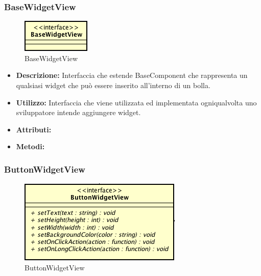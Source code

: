 \subsubsection{BaseWidgetView}

\label{BaseWidgetView}
\begin{figure}[ht]
	\centering
	\includegraphics[scale=0.5]{Sezioni/SottosezioniST/img/BaseWidgetView.png}
	\caption{BaseWidgetView}
\end{figure}

\begin{itemize}
\item \textbf{Descrizione:} Interfaccia che estende BaseComponent che rappresenta un qualsiasi widget che può essere inserito all'interno di un bolla.
\item \textbf{Utilizzo:} Interfaccia che viene utilizzata ed implementata ogniqualvolta uno sviluppatore intende aggiungere widget.
\item \textbf{Attributi:}
\item \textbf{Metodi:}
\end{itemize}

\subsubsection{ButtonWidgetView}

\label{ButtonWidgetView}
\begin{figure}[ht]
	\centering
	\includegraphics[scale=0.5]{Sezioni/SottosezioniST/img/ButtonWidgetView.png}
	\caption{ButtonWidgetView}
\end{figure}

